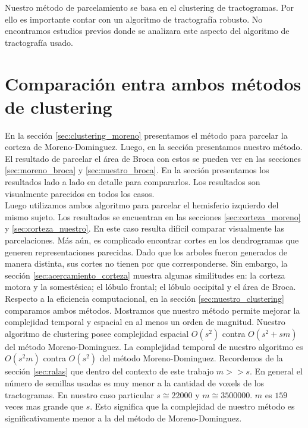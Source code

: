 Nuestro m\'etodo de parcelamiento se basa en el clustering de 
tractogramas. Por ello es importante contar con un algoritmo de 
tractograf\'ia robusto. No encontramos estudios previos donde se analizara
este aspecto del algoritmo de tractograf\'ia usado. \\


\section{Comparaci\'on entra ambos m\'etodos de clustering}

En la secci\'on \ref{sec:clustering_moreno} presentamos el m\'etodo para
parcelar la corteza de Moreno-Dominguez. Luego, en la secci\'on
\label{ch:nuestro} presentamos nuestro m\'etodo. El resultado de parcelar
el \'area de Broca con estos se pueden ver en las secciones 
\ref{sec:moreno_broca} y \ref{sec:nuestro_broca}. En la secci\'on 
\label{sec:acercamiento} presentamos los resultados lado a lado en detalle
para compararlos. Los resultados son visualmente parecidos en todos los
casos. \\

Luego utilizamos ambos algoritmo para parcelar el hemisferio izquierdo del
mismo sujeto. Los resultados se encuentran en las secciones 
\ref{sec:corteza_moreno} y \ref{sec:corteza_nuestro}. En este caso 
resulta dif\'icil comparar visualmente las parcelaciones. M\'as a\'un, es
complicado encontrar cortes en los dendrogramas que generen
representaciones parecidas. Dado que los arboles fueron generados
de manera distinta, sus cortes no tienen por que corresponderse. Sin
embargo, la secci\'on \ref{sec:acercamiento_corteza} muestra algunas
similitudes en: la corteza motora y la somest\'esica; el l\'obulo frontal;
el l\'obulo occipital y el \'area de Broca. \\

Respecto a la eficiencia computacional, en la secci\'on 
\ref{sec:nuestro_clustering} comparamos ambos m\'etodos. 
Mostramos que nuestro m\'etodo permite mejorar la complejidad temporal y
espacial en al menos un orden de magnitud. Nuestro algoritmo de clustering
posee complejidad espacial $O(s^2)$ contra $O(s^2 + sm)$ del m\'etodo
Moreno-Dominguez. La complejidad temporal de nuestro algoritmo es $O(s^2m)$
contra $O(s^2)$ del m\'etodo Moreno-Dominguez. Recordemos de la secci\'on
\ref{sec:ralas} que dentro del contexto de este trabajo $m >> s$. En
general el n\'umero de semillas usadas es muy menor a la cantidad de
voxels de los tractogramas. En nuestro caso particular $s \cong 22000$ y
$m \cong 3500000$. $m$ es $159$ veces mas grande que $s$. Esto significa
que la complejidad de nuestro m\'etodo es significativamente menor a la
del m\'etodo de Moreno-Dominguez. \\



